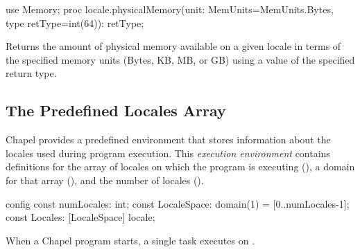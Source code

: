 \begin{protohead}
use Memory;
proc locale.physicalMemory(unit: MemUnits=MemUnits.Bytes, type retType=int(64)): retType;
\end{protohead}
\begin{protobody}
Returns the amount of physical memory available on a given locale in
terms of the specified memory units (Bytes, KB, MB, or GB) using a
value of the specified return type.
\end{protobody}




\subsection{The Predefined Locales Array}
\label{Predefined_Locales_Array}

Chapel provides a predefined environment that stores information about
the locales used during program execution.  This {\em execution
environment} contains definitions for the array of locales on which
the program is executing (), a domain for that array
(), and the number of locales ().
\begin{chapel}
config const numLocales: int;
const LocaleSpace: domain(1) = [0..numLocales-1];
const Locales: [LocaleSpace] locale;
\end{chapel}
When a Chapel program starts, a single task executes 
on .

